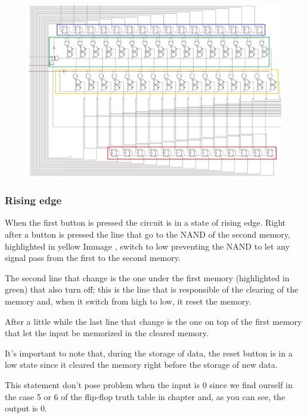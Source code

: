\documentclass{article}
\begin{document}
\begin{figure}[h]
    \centering
    \includegraphics[scale=.55]{IM_Converter.PNG}
    \caption{}
    \label{Converter}
\end{figure}


\subsubsection{Rising edge}

When the first button is pressed the circuit is in a state of rising edge. Right after a button is pressed the line that go to the NAND of the second memory, highlighted in yellow Immage %
, switch to low preventing the NAND to let any signal pass from the first to the second memory.

The second line that change is the one under the first memory (highlighted in green) that also turn off; this is the line that is responsible of the clearing of the memory and, when it switch from high to low, it reset the memory.

After a little while the last line that change is the one on top of the first memory that let the input be memorized in the cleared memory.

\vspace{3mm}

It's important to note that, during the storage of data, the reset button is in a low state since it cleared the memory right before the storage of new data.

This statement don't pose problem when the input is 0 since we find ourself in the case 5 or 6 of the flip-flop truth table in chapter %
and, as you can see, the output is 0. 
\end{document}
